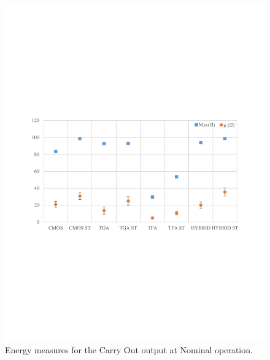 \documentclass[ecp,tc, english]{iiufrgs}
\begin{document}
\begin{figure}[H]
\centering
\includegraphics[width=\textwidth, trim={0 9cm 0 9cm},clip]{energyNominalCarryOut.pdf}
\caption{Energy measures for the Carry Out output at Nominal operation.}
\label{fig:energyNCO}
\end{figure}
\end{document}
